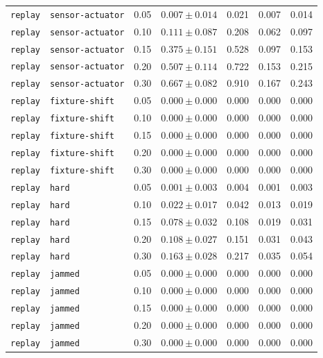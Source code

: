 \documentclass{article}
\begin{document}
\begin{center}
\begin{tabular}{lllcccc}
\texttt{replay} & \texttt{sensor-actuator} & 0.05 & $0.007 \pm 0.014$ & 0.021 & 0.007 & 0.014 \\
\texttt{replay} & \texttt{sensor-actuator} & 0.10 & $0.111 \pm 0.087$ & 0.208 & 0.062 & 0.097 \\
\texttt{replay} & \texttt{sensor-actuator} & 0.15 & $0.375 \pm 0.151$ & 0.528 & 0.097 & 0.153 \\
\texttt{replay} & \texttt{sensor-actuator} & 0.20 & $0.507 \pm 0.114$ & 0.722 & 0.153 & 0.215 \\
\texttt{replay} & \texttt{sensor-actuator} & 0.30 & $0.667 \pm 0.082$ & 0.910 & 0.167 & 0.243 \\
\texttt{replay} & \texttt{fixture-shift} & 0.05 & $0.000 \pm 0.000$ & 0.000 & 0.000 & 0.000 \\
\texttt{replay} & \texttt{fixture-shift} & 0.10 & $0.000 \pm 0.000$ & 0.000 & 0.000 & 0.000 \\
\texttt{replay} & \texttt{fixture-shift} & 0.15 & $0.000 \pm 0.000$ & 0.000 & 0.000 & 0.000 \\
\texttt{replay} & \texttt{fixture-shift} & 0.20 & $0.000 \pm 0.000$ & 0.000 & 0.000 & 0.000 \\
\texttt{replay} & \texttt{fixture-shift} & 0.30 & $0.000 \pm 0.000$ & 0.000 & 0.000 & 0.000 \\
\texttt{replay} & \texttt{hard} & 0.05 & $0.001 \pm 0.003$ & 0.004 & 0.001 & 0.003 \\
\texttt{replay} & \texttt{hard} & 0.10 & $0.022 \pm 0.017$ & 0.042 & 0.013 & 0.019 \\
\texttt{replay} & \texttt{hard} & 0.15 & $0.078 \pm 0.032$ & 0.108 & 0.019 & 0.031 \\
\texttt{replay} & \texttt{hard} & 0.20 & $0.108 \pm 0.027$ & 0.151 & 0.031 & 0.043 \\
\texttt{replay} & \texttt{hard} & 0.30 & $0.163 \pm 0.028$ & 0.217 & 0.035 & 0.054 \\
\texttt{replay} & \texttt{jammed} & 0.05 & $0.000 \pm 0.000$ & 0.000 & 0.000 & 0.000 \\
\texttt{replay} & \texttt{jammed} & 0.10 & $0.000 \pm 0.000$ & 0.000 & 0.000 & 0.000 \\
\texttt{replay} & \texttt{jammed} & 0.15 & $0.000 \pm 0.000$ & 0.000 & 0.000 & 0.000 \\
\texttt{replay} & \texttt{jammed} & 0.20 & $0.000 \pm 0.000$ & 0.000 & 0.000 & 0.000 \\
\texttt{replay} & \texttt{jammed} & 0.30 & $0.000 \pm 0.000$ & 0.000 & 0.000 & 0.000 \\

\end{tabular}
\end{center}
\end{document}
